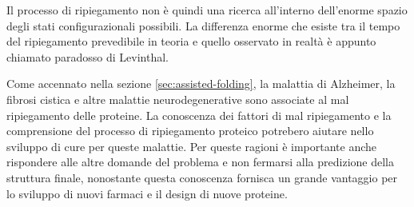 {\par Il processo di ripiegamento non è quindi una ricerca all'interno dell'enorme spazio degli stati configurazionali possibili. La differenza enorme che esiste tra il tempo del ripiegamento prevedibile in teoria e quello osservato in realtà è appunto chiamato paradosso di Levinthal.

\par Come accennato nella sezione \ref{sec:assisted-folding}, la malattia di Alzheimer, la fibrosi cistica e altre malattie neurodegenerative sono associate al mal ripiegamento delle proteine. La conoscenza dei fattori di mal ripiegamento e la comprensione del processo di ripiegamento proteico potrebero aiutare nello sviluppo di cure per queste malattie. Per queste ragioni è importante anche rispondere alle altre domande del problema e non fermarsi alla predizione della struttura finale, nonostante questa conoscenza fornisca un grande vantaggio per lo sviluppo di nuovi farmaci e il design di nuove proteine.
}
\clearpage